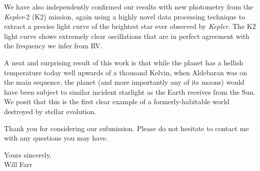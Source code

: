 \documentclass[11pt]{letter} %
\begin{document}
\begin{letter}
We have also independently confirmed our results with new photometry from the \emph{Kepler}-2 (K2) mission, again using a highly novel data processing technique to extract a precise light curve of the brightest star ever observed by \emph{Kepler}. The K2 light curve shows extremely clear oscillations that are in perfect agreement with the frequency we infer from RV. 

A neat and surprising result of this work is that while the planet has a hellish temperature today well upwards of a thousand Kelvin, when Aldebaran was on the main sequence, the planet (and more importantly any of its moons) would have been subject to similar incident starlight as the Earth receives from the Sun. We posit that this is the first clear example of a formerly-habitable world destroyed by stellar evolution.

Thank you for considering our submission. Please do not hesitate to contact me with any questions you may have.\\

\closing{Yours sincerely, \\
\vspace{1.5cm}
Will Farr} 
  

\end{letter}
 
\end{document}
